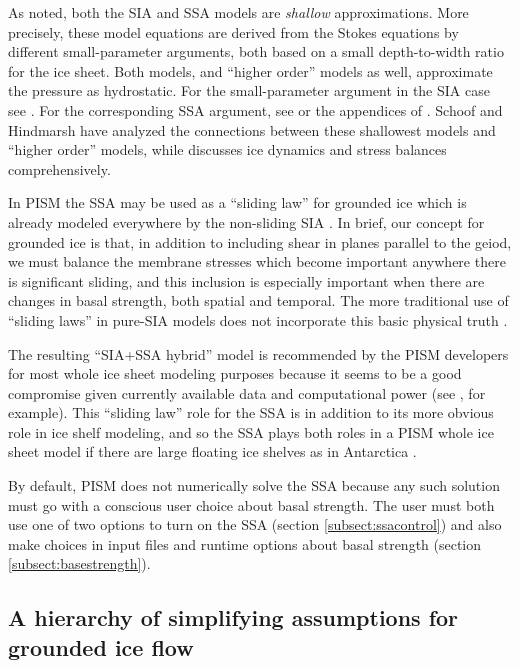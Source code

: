 \documentclass[titlepage,letterpaper,final]{scrartcl}
\begin{document}
As noted, both the SIA and SSA models are \emph{shallow} approximations.  More precisely, these model equations are derived from the Stokes equations by different small-parameter arguments, both based on a small depth-to-width ratio for the ice sheet.  Both models, and ``higher order'' models as well, approximate the pressure as hydrostatic.  For the small-parameter argument in the SIA case see \cite{Fowler}.  For the corresponding SSA argument, see \cite{WeisGreveHutter} or the appendices of \cite{SchoofStream}.  Schoof and Hindmarsh \cite{SchoofHindmarsh} have analyzed the connections between these shallowest models and ``higher order'' models, while \cite{GreveBlatter2009} discusses ice dynamics and stress balances comprehensively.

In PISM the SSA may be used as a ``sliding law'' for grounded ice which is already modeled everywhere by the non-sliding SIA \cite{BBssasliding}.  In brief, our concept for grounded ice is that, in addition to including shear in planes parallel to the geiod, we must balance the membrane stresses which become important anywhere there is significant sliding, and this inclusion is especially important when there are changes in basal strength, both spatial and temporal.  The more traditional use of ``sliding laws'' in pure-SIA models does not incorporate this basic physical truth \cite{Fowler01}.

The resulting ``SIA+SSA hybrid'' model is recommended by the PISM developers for most whole ice sheet modeling purposes because it seems to be a good compromise given currently available data and computational power (see \cite{BKAJS,Martinetal2010TCD,Winkelmannetal2010TCD}, for example).  This ``sliding law'' role for the SSA is in addition to its more obvious role in ice shelf modeling, and so the SSA plays both roles in a PISM whole ice sheet model if there are large floating ice shelves as in Antarctica \cite{Martinetal2010TCD,Winkelmannetal2010TCD}.

By default, PISM does not numerically solve the SSA because any such solution must go with a conscious user choice about basal strength.  The user must both use one of two options to turn on the SSA (section \ref{subsect:ssacontrol}) and also make choices in input files and runtime options about basal strength (section \ref{subsect:basestrength}).


\subsection{A hierarchy of simplifying assumptions for grounded ice flow}
\label{sec:model-hierarchy}
\end{document}
